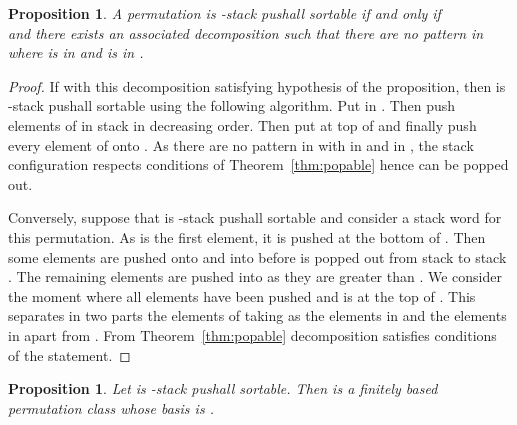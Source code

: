 \documentclass[11pt]{article}
\newtheorem{prop}[thm]{Proposition}
\newcommand{\pushall}{-stack pushall sortable\xspace}
\begin{document}
\begin{prop}
\label{prop:+[1,x]pt}
A permutation  is \pushall if and only if \\
 and there exists an associated decomposition  
such that there are no pattern  in  where  is in  and  is in .
\end{prop}
\begin{proof}
If  with this decomposition satisfying hypothesis of the proposition, then  is \pushall using the following algorithm. 
Put  in . 
Then push elements of  in stack  in decreasing order. 
Then put  at top of  and finally push every element of  onto . 
As there are no pattern  in  with  in  and  in , the stack configuration respects conditions of Theorem~\ref{thm:popable} hence can be popped out.

Conversely, suppose that  is \pushall and consider a stack word for this permutation. 
As  is the first element, it is pushed at the bottom of . 
Then some elements are pushed onto  and into  before  is popped out from stack  to stack . 
The remaining elements are pushed into  as they are greater than . 
We consider the moment where all elements have been pushed and  is at the top of . 
This separates in two parts the elements of  taking  as the elements in  and  the elements in  apart from . 
From Theorem~\ref{thm:popable} decomposition  satisfies conditions of the statement.
\end{proof}

\begin{prop}
\label{prop:B2}
Let  is \pushall . 
Then  is a finitely based permutation class whose basis is .
\end{prop}
\end{document}
